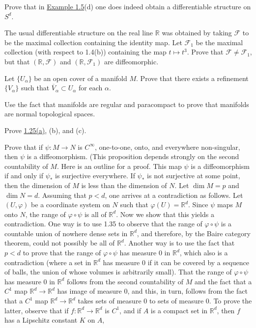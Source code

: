 \begin{problemset}
	\item Prove that in \hyperref[thm:1.5]{Example 1.5}(d) one does indeed obtain a differentiable structure on  $ S^{d} $.

	\item The usual differentiable structure on the real line $\mathbb{R}$ was obtained by taking $\mathcal{F}$ to be the maximal collection containing the identity map. Let $\mathcal{F}_1$ be the maximal collection (with respect to 1.4(b)) containing the map $t \mapsto t^3$. Prove that $\mathcal{F} \neq \mathcal{F}_1$, but that $(\mathbb{R},\mathcal{F})$ and $(\mathbb{R},\mathcal{F}_1)$ are diffeomorphic.

	\item Let $\{U_{\alpha}\}$ be an open cover of a manifold $M$. Prove that there exists a refinement $\{V_{\alpha}\}$ such that $\overline{V}_{\alpha} \subset U_{\alpha}$ for each $\alpha$.

	\item Use the fact that manifolds are regular and paracompact to prove that manifolds are normal topological spaces.

	\item Prove \hyperref[thm:1.25]{1.25(a)}, (b), and (c).

	\item Prove that if $\psi: M \to N$ is $C^{\infty}$, one-to-one, onto, and everywhere non-singular, then $\psi$ is a diffeomorphism. (This proposition depends strongly on the second countability of $M$. Here is an outline for a proof. This map $\psi$ is a diffeomorphism if and only if $\psi_{*}$ is surjective everywhere. If $\psi_{*}$ is not surjective at some point, then the dimension of $M$ is less than the dimension of $N$. Let $\dim M = p$ and $\dim N = d$. Assuming that $p < d$, one arrives at a contradiction as follows. Let $(U,\varphi)$ be a coordinate system on $N$ such that $\varphi(U) = \mathbb{R}^d$. Since $\psi$ maps $M$ onto $N$, the range of $\varphi \circ \psi$ is all of $\mathbb{R}^d$. Now we show that this yields a contradiction. One way is to use 1.35 to observe that the range of $\varphi \circ \psi$ is a countable union of nowhere dense sets in $\mathbb{R}^d$, and therefore, by the Baire category theorem, could not possibly be all of $\mathbb{R}^d$. Another way is to use the fact that $p < d$ to prove that the range of $\varphi \circ \psi$ has measure 0 in $\mathbb{R}^d$, which also is a contradiction (where a set in $\mathbb{R}^d$ has measure 0 if it can be covered by a sequence of balls, the union of whose volumes is arbitrarily small). That the range of $\varphi \circ \psi$ has measure 0 in $\mathbb{R}^d$ follows from the second countability of $M$ and the fact that a $C^1$ map $\mathbb{R}^d \to \mathbb{R}^d$ has image of measure 0, and this, in turn, follows from the fact that a $C^1$ map $\mathbb{R}^d \to \mathbb{R}^d$ takes sets of measure 0 to sets of measure 0. To prove the latter, observe that if $f: \mathbb{R}^d \to \mathbb{R}^d$ is $C^1$, and if $A$ is a compact set in $\mathbb{R}^d$, then $f$ has a Lipschitz constant $K$ on $A$,


\end{problemset}
